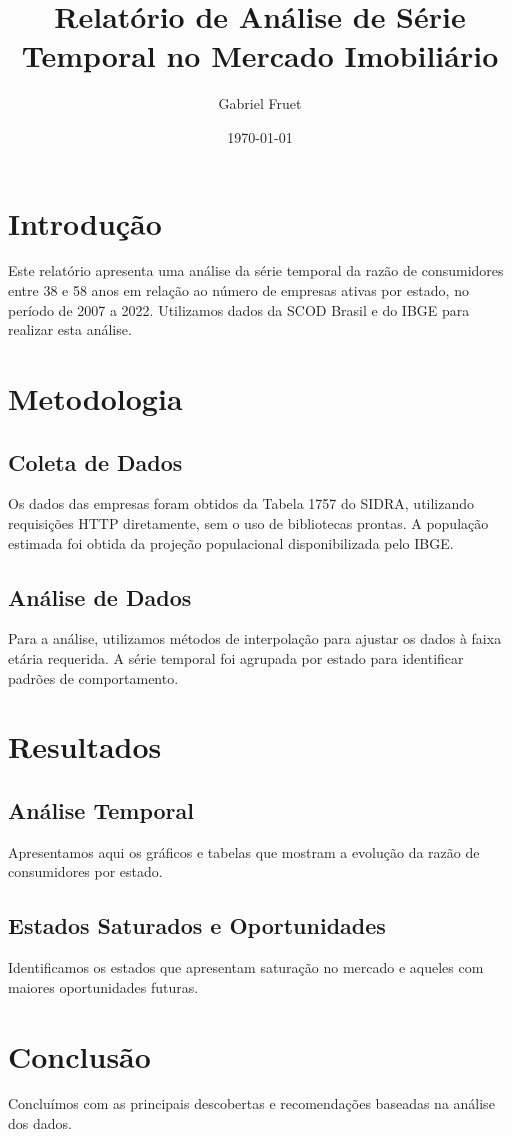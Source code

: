 \documentclass[12pt]{article}
\title{Relatório de Análise de Série Temporal no Mercado Imobiliário}
\author{Gabriel Fruet}
\date{\today}
\begin{document}
\maketitle

\section{Introdução}
Este relatório apresenta uma análise da série temporal da razão de consumidores entre 38 e 58 anos em relação ao número de empresas ativas por estado, no período de 2007 a 2022. Utilizamos dados da SCOD Brasil e do IBGE para realizar esta análise.

\section{Metodologia}
\subsection{Coleta de Dados}
Os dados das empresas foram obtidos da Tabela 1757 do SIDRA, utilizando requisições HTTP diretamente, sem o uso de bibliotecas prontas. A população estimada foi obtida da projeção populacional disponibilizada pelo IBGE.

\subsection{Análise de Dados}
Para a análise, utilizamos métodos de interpolação para ajustar os dados à faixa etária requerida. A série temporal foi agrupada por estado para identificar padrões de comportamento.

\section{Resultados}
\subsection{Análise Temporal}
Apresentamos aqui os gráficos e tabelas que mostram a evolução da razão de consumidores por estado.

\subsection{Estados Saturados e Oportunidades}
Identificamos os estados que apresentam saturação no mercado e aqueles com maiores oportunidades futuras.

\section{Conclusão}
Concluímos com as principais descobertas e recomendações baseadas na análise dos dados.
\end{document}
